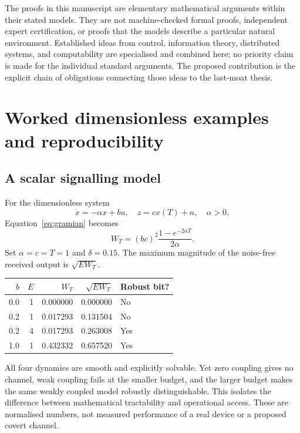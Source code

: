 \documentclass[11pt,a4paper]{article}
\theoremstyle{definition}
\theoremstyle{remark}
\begin{document}
The proofs in this manuscript are elementary mathematical arguments within their stated models. They are not machine-checked formal proofs, independent expert certification, or proofs that the models describe a particular natural environment. Established ideas from control, information theory, distributed systems, and computability are specialised and combined here; no priority claim is made for the individual standard arguments. The proposed contribution is the explicit chain of obligations connecting those ideas to the last-moat thesis.

\Needspace{0.32\textheight}
\section{Worked dimensionless examples and reproducibility}\label{app:examples}
\subsection{A scalar signalling model}
For the dimensionless system
\[
 \dot x=-\alpha x+bu,\quad z=cx(T)+n,\quad \alpha>0,
\]
Equation~\eqref{eq:gramian} becomes
\begin{equation}\label{eq:scalar}
 W_T=(bc)^2\frac{1-e^{-2\alpha T}}{2\alpha}.
\end{equation}
Set $\alpha=c=T=1$ and $\delta=0.15$. The maximum magnitude of the noise-free received output is $\sqrt{EW_T}$.
\begin{center}
\begin{tabular}{@{}rrrrl@{}}
\toprule
$b$ & $E$ & $W_T$ & $\sqrt{EW_T}$ & Robust bit?\\
\midrule
0.0 & 1 & 0.000000 & 0.000000 & No\\
0.2 & 1 & 0.017293 & 0.131504 & No\\
0.2 & 4 & 0.017293 & 0.263008 & Yes\\
1.0 & 1 & 0.432332 & 0.657520 & Yes\\
\bottomrule
\end{tabular}
\end{center}
All four dynamics are smooth and explicitly solvable. Yet zero coupling gives no channel, weak coupling fails at the smaller budget, and the larger budget makes the same weakly coupled model robustly distinguishable. This isolates the difference between mathematical tractability and operational access. These are normalised numbers, not measured performance of a real device or a proposed covert channel.
\end{document}
